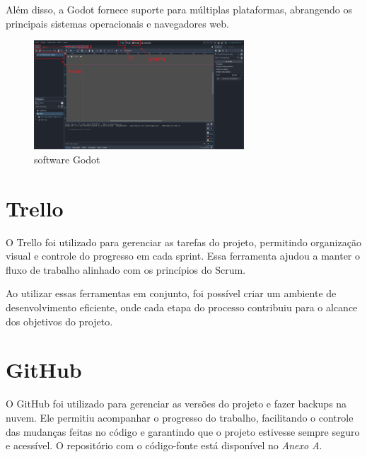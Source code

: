 Além disso, a Godot fornece suporte para múltiplas plataformas, abrangendo os principais sistemas operacionais e navegadores web.

\begin{figure}[htbp]
    \centering
    \caption{software Godot}
    \label{fig:godot}
    \includegraphics[width=0.7\textwidth]{figuras/godot-use.png}
\end{figure}

\section{Trello}

O Trello foi utilizado para gerenciar as tarefas do projeto, permitindo organização visual e controle do progresso em cada sprint. Essa ferramenta ajudou a manter o fluxo de trabalho alinhado com os princípios do Scrum.

Ao utilizar essas ferramentas em conjunto, foi possível criar um ambiente de desenvolvimento eficiente, onde cada etapa do processo contribuiu para o alcance dos objetivos do projeto.

\section{GitHub}

O GitHub foi utilizado para gerenciar as versões do projeto e fazer backups na nuvem. Ele permitiu acompanhar o progresso do trabalho, facilitando o controle das mudanças feitas no código e garantindo que o projeto estivesse sempre seguro e acessível. O repositório com o código-fonte está disponível no \textit{Anexo A}.

